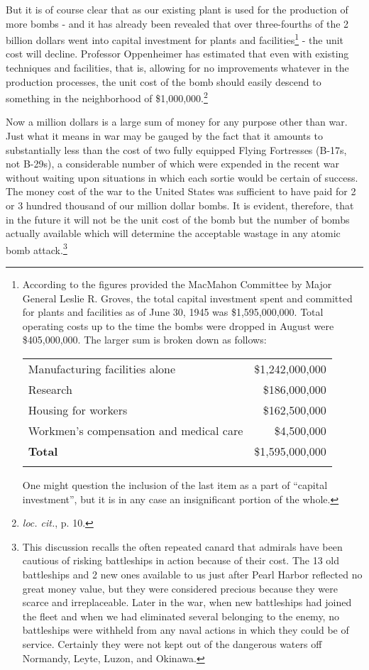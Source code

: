 But it is of course clear that as our existing plant is used for the production of more bombs - and it has already been revealed that over three-fourths of the 2 billion dollars went into capital investment for plants and facilities\footnote{According to the figures provided the MacMahon Committee by Major General Leslie R. Groves, the total capital investment spent and committed for plants and facilities as of June 30, 1945 was \$1,595,000,000. Total operating costs up to the time the bombs were dropped in August were \$405,000,000. The larger sum is broken down as follows:

\vspace{10pt}

\begin{tabular}{@{}lr@{}}
\toprule
Manufacturing facilities alone				&	\$1,242,000,000\\
Research								&	\$186,000,000\\
Housing for workers						&	\$162,500,000\\
Workmen's compensation and medical care	&	\$4,500,000\\
\midrule
\textbf{Total}							&	\$1,595,000,000\\
\botrule
\end{tabular}

\vspace{10pt}

One might question the inclusion of the last item as a part of ``capital investment'', but it is in any case an insignificant portion of the whole.} - the unit cost will decline. Professor Oppenheimer has estimated that even with existing techniques and facilities, that is, allowing for no improvements whatever in the production processes, the unit cost of the bomb should easily descend to something in the neighborhood of \$1,000,000.\footnote{\textit{loc. cit.}, p. 10.}

Now a million dollars is a large sum of money for any purpose other than war. Just what it means in war may be gauged by the fact that it amounts to substantially less than the cost of two fully equipped Flying Fortresses (B-17s, not B-29s), a considerable number of which were expended in the recent war without waiting upon situations in which each sortie would be certain of success. The money cost of the war to the United States was sufficient to have paid for 2 or 3 hundred thousand of our million dollar bombs. It is evident, therefore, that in the future it will not be the unit cost of the bomb but the number of bombs actually available which will determine the acceptable wastage in any atomic bomb attack.\footnote{This discussion recalls the often repeated canard that admirals have been cautious of risking battleships in action because of their cost. The 13 old battleships and 2 new ones available to us just after Pearl Harbor reflected no great money value, but they were considered precious because they were scarce and irreplaceable. Later in the war, when new battleships had joined the fleet and when we had eliminated several belonging to the enemy, no battleships were withheld from any naval actions in which they could be of service. Certainly they were not kept out of the dangerous waters off Normandy, Leyte, Luzon, and Okinawa.}

